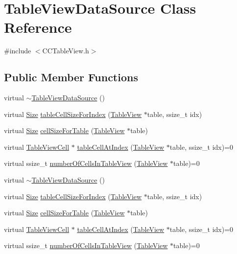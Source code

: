 \hypertarget{classTableViewDataSource}{}\section{Table\+View\+Data\+Source Class Reference}
\label{classTableViewDataSource}


{\ttfamily \#include $<$C\+C\+Table\+View.\+h$>$}

\subsection*{Public Member Functions}
\begin{DoxyCompactItemize}
\item 
virtual \hyperlink{classTableViewDataSource_a79010e519dfdf9a50b80a1c412e4108e}{$\sim$\+Table\+View\+Data\+Source} ()
\item 
virtual \hyperlink{classSize}{Size} \hyperlink{classTableViewDataSource_a5c5afba703e5557f07309e0057ffa93d}{table\+Cell\+Size\+For\+Index} (\hyperlink{classTableView}{Table\+View} $\ast$table, ssize\+\_\+t idx)
\item 
virtual \hyperlink{classSize}{Size} \hyperlink{classTableViewDataSource_af2a76d861999dc23861037aa67c8dc24}{cell\+Size\+For\+Table} (\hyperlink{classTableView}{Table\+View} $\ast$table)
\item 
virtual \hyperlink{classTableViewCell}{Table\+View\+Cell} $\ast$ \hyperlink{classTableViewDataSource_a99fb9d2eb387eb2ed83609c923f21fea}{table\+Cell\+At\+Index} (\hyperlink{classTableView}{Table\+View} $\ast$table, ssize\+\_\+t idx)=0
\item 
virtual ssize\+\_\+t \hyperlink{classTableViewDataSource_a033505a81587ecbb3731537840451198}{number\+Of\+Cells\+In\+Table\+View} (\hyperlink{classTableView}{Table\+View} $\ast$table)=0
\item 
virtual \hyperlink{classTableViewDataSource_a79010e519dfdf9a50b80a1c412e4108e}{$\sim$\+Table\+View\+Data\+Source} ()
\item 
virtual \hyperlink{classSize}{Size} \hyperlink{classTableViewDataSource_ae26619b379008e9191aeedc785fff30d}{table\+Cell\+Size\+For\+Index} (\hyperlink{classTableView}{Table\+View} $\ast$table, ssize\+\_\+t idx)
\item 
virtual \hyperlink{classSize}{Size} \hyperlink{classTableViewDataSource_aabfec607877c875c679f571c508bb4a0}{cell\+Size\+For\+Table} (\hyperlink{classTableView}{Table\+View} $\ast$table)
\item 
virtual \hyperlink{classTableViewCell}{Table\+View\+Cell} $\ast$ \hyperlink{classTableViewDataSource_a99fb9d2eb387eb2ed83609c923f21fea}{table\+Cell\+At\+Index} (\hyperlink{classTableView}{Table\+View} $\ast$table, ssize\+\_\+t idx)=0
\item 
virtual ssize\+\_\+t \hyperlink{classTableViewDataSource_a033505a81587ecbb3731537840451198}{number\+Of\+Cells\+In\+Table\+View} (\hyperlink{classTableView}{Table\+View} $\ast$table)=0
\end{DoxyCompactItemize}


